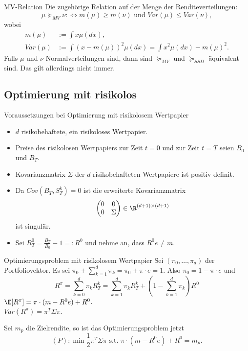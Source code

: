 \begin{karte}{MV-Relation}
Die zugehörige Relation auf der Menge der Renditeverteilungen: 
\[ \mu \succeq_{MV} \nu :\Leftrightarrow m(\mu) \geq m(\nu) \text{ und } Var(\mu) \leq Var(\nu), \]
wobei 
\begin{align*}
    m(\mu) &:= \int x \mu(dx), \\
    Var(\mu) &:= \int (x - m(\mu))^2 \mu(dx) = \int x^2 \mu(dx) - m(\mu)^2.
\end{align*}
Falls \(\mu\) und \(\nu\) Normalverteilungen sind, dann sind \(\succeq_{MV}\) 
und \(\succeq_{SSD}\) äquivalent sind. Das gilt allerdings nicht immer.
\end{karte}

\subsection{Optimierung mit risikolos}

\begin{karte}{Voraussetzungen bei Optimierung mit risikolosem Wertpapier}
\begin{itemize}
    \item \(d\) risikobehaftete, ein risikoloses Wertpapier. 
    \item Preise des risikolosen Wertpapiers zur Zeit \(t = 0\) und zur Zeit \(t=T\)
    seien \(B_0\) und \(B_T\). 
    \item Kovarianzmatrix \(\Sigma\) der \(d\) risikobehafteten Wertpapiere ist positiv definit.
    \item Da \(Cov(B_T, S_T^k) = 0\) ist die erweiterte Kovarianzmatrix 
    \[ \begin{pmatrix}
        0 & 0 \\ 0 & \Sigma
    \end{pmatrix} \in \R^{(d+1)\times (d+1)} \]
    ist singulär.
    \item Sei \(R_T^0 = \frac{B_T}{B_0} - 1 =: R^0\) und nehme an, dass \(R^0 e \neq m\).
\end{itemize}
\end{karte}

\begin{karte}{Optimierungsproblem mit risikolosem Wertpapier}
Sei \((\pi_0, \ldots, \pi_d)\) der Portfoliovektor. 
Es sei \(\pi_0 + \sum_{k=1}^d \pi_k = \pi_0 + \pi \cdot e = 1\).
Also \(\pi_0 = 1 - \pi \cdot e\) und 
\[ R^\pi = \sum_{k=0}^d \pi_k R_T^k = \sum_{k=1}^d \pi_k R_T^k + (1 - \sum_{k=1}^d \pi_k) R^0 \]
\(\E[R^\pi] = \pi \cdot (m - R^0 e) + R^0\).\\
\(Var(R^\pi) = \pi^T \Sigma \pi\).

Sei \(m_p\) die Zielrendite, so ist das Optimierungsproblem jetzt 
\[ (P): \min \frac{1}{2} \pi^T \Sigma \pi \text{ s.t. } \pi \cdot (m - R^0 e) + R^0 = m_p. \]
\end{karte}

